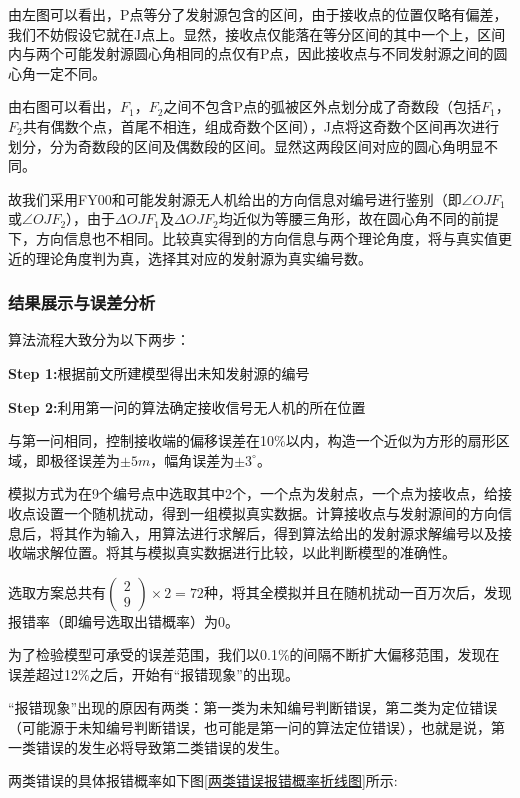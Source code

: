 \documentclass{ctexart}
\begin{document}
由左图可以看出，P点等分了发射源包含的区间，由于接收点的位置仅略有偏差，我们不妨假设它就在J点上。显然，接收点仅能落在等分区间的其中一个上，区间内与两个可能发射源圆心角相同的点仅有P点，因此接收点与不同发射源之间的圆心角一定不同。

由右图可以看出，$F_1$，$F_2$之间不包含P点的弧被区外点划分成了奇数段（包括$F_1$，$F_2$共有偶数个点，首尾不相连，组成奇数个区间），J点将这奇数个区间再次进行划分，分为奇数段的区间及偶数段的区间。显然这两段区间对应的圆心角明显不同。

故我们采用FY00和可能发射源无人机给出的方向信息对编号进行鉴别（即$\angle OJF_1$或$\angle OJF_2$），由于$\Delta OJF_1$及$\Delta OJF_2$均近似为等腰三角形，故在圆心角不同的前提下，方向信息也不相同。比较真实得到的方向信息与两个理论角度，将与真实值更近的理论角度判为真，选择其对应的发射源为真实编号数。

\subsubsection{结果展示与误差分析}

算法流程大致分为以下两步：

\textbf{Step 1:}根据前文所建模型得出未知发射源的编号

\textbf{Step 2:}利用第一问的算法确定接收信号无人机的所在位置

与第一问相同，控制接收端的偏移误差在10\%以内，构造一个近似为方形的扇形区域，即极径误差为$\pm 5m $，幅角误差为$\pm 3^{\circ}$。

模拟方式为在9个编号点中选取其中2个，一个点为发射点，一个点为接收点，给接收点设置一个随机扰动，得到一组模拟真实数据。计算接收点与发射源间的方向信息后，将其作为输入，用算法进行求解后，得到算法给出的发射源求解编号以及接收端求解位置。将其与模拟真实数据进行比较，以此判断模型的准确性。

选取方案总共有$\begin{pmatrix} 2 \\ 9 \end{pmatrix}\times 2=72$种，将其全模拟并且在随机扰动一百万次后，发现报错率（即编号选取出错概率）为0。

为了检验模型可承受的误差范围，我们以0.1\%的间隔不断扩大偏移范围，发现在误差超过12\%之后，开始有“报错现象”的出现。

“报错现象”出现的原因有两类：第一类为未知编号判断错误，第二类为定位错误（可能源于未知编号判断错误，也可能是第一问的算法定位错误），也就是说，第一类错误的发生必将导致第二类错误的发生。

两类错误的具体报错概率如下图\ref{两类错误报错概率折线图}所示:
\end{document}
